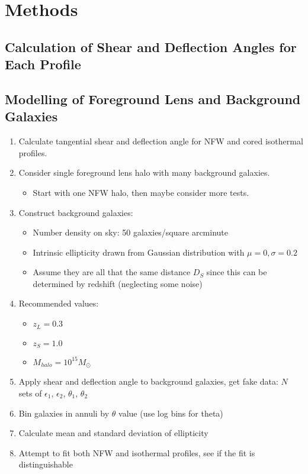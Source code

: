\documentclass[10pt]{article}
\begin{document}
\newpage

\section{Methods}
\subsection{Calculation of Shear and Deflection Angles for Each Profile}

\subsection{Modelling of Foreground Lens and Background Galaxies}

\begin{enumerate}
    \item Calculate tangential shear and deflection angle for NFW and cored isothermal profiles.
    \item Consider single foreground lens halo with many background galaxies.
    \begin{itemize}
        \item Start with one NFW halo, then maybe consider more tests.
    \end{itemize}
    \item Construct background galaxies:
    \begin{itemize}
        \item Number density on sky: 50 galaxies/square arcminute
        \item Intrinsic ellipticity drawn from Gaussian distribution with $\mu=0, \sigma=0.2$
        \item Assume they are all that the same distance $D_S$ since this can be determined by redshift (neglecting some noise)
    \end{itemize}
    \item Recommended values:
    \begin{itemize}
        \item $z_L = 0.3$
        \item $z_S = 1.0$
        \item $M_{halo} = 10^{15} M_\odot$
    \end{itemize}
    \item Apply shear and deflection angle to background galaxies, get fake data: $N$ sets of $\epsilon_1$, $\epsilon_2$, $\theta_1$, $\theta_2$
    \item Bin galaxies in annuli by $\theta$ value (use log bins for theta)
    \item Calculate mean and standard deviation of ellipticity
    \item Attempt to fit both NFW and isothermal profiles, see if the fit is distinguishable
\end{enumerate}
\end{document}
